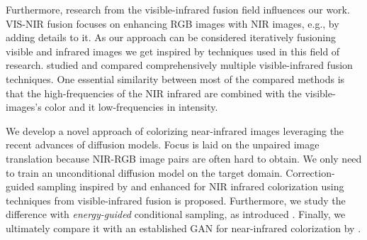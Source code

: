 Furthermore, research from the visible-infrared fusion field influences our work.
VIS-NIR fusion focuses on enhancing RGB images with NIR images, e.g., by adding details to it. 
As our approach can be considered iteratively fusioning visible and infrared images we get inspired by techniques used in this field of research.  
\textcite{study-vis-nir-fusion} studied and compared comprehensively multiple visible-infrared fusion techniques. 
One essential similarity between most of the compared methods is that the high-frequencies of the NIR infrared are combined with the visible-images's color and it low-frequencies in intensity.

We develop a novel approach of colorizing near-infrared images leveraging the recent advances of diffusion models. 
Focus is laid on the unpaired image translation because NIR-RGB image pairs are often hard to obtain. 
We only need to train an unconditional diffusion model on the target domain. 
Correction-guided sampling inspired by \textcite{ilvr} and enhanced for NIR infrared colorization using techniques from visible-infrared fusion \parencite{study-vis-nir-fusion} is proposed. 
Furthermore, we study the difference with \textit{energy-guided} conditional sampling, as introduced \textcite{egsde}. 
Finally, we ultimately compare it with an established GAN for near-infrared colorization by \textcite{mehri}. 